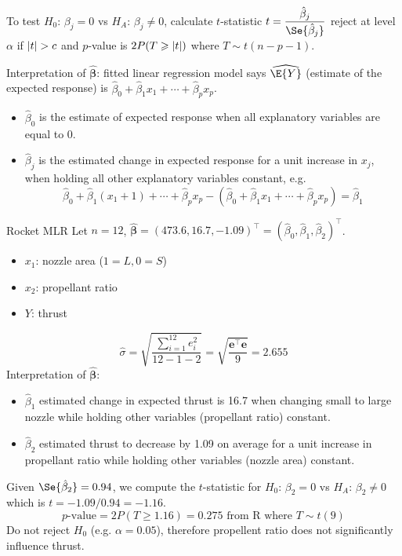 To test $ H_0 $: $ \beta_j=0 $ vs $ H_A $: $ \beta_j\neq 0 $,
calculate $ t $-statistic
$ t=\dfrac{\hat{\beta}_j}{\Se{\hat{\beta}_j}} $
reject at level $ \alpha $ if $ \lvert t\rvert>c $ and
$ p $-value is $ 2P(T\geqslant \lvert t\rvert) $ where $ T \sim t(n-p-1) $.

Interpretation of $ \hat{\symbf{\beta}} $: fitted linear
regression model says $ \widehat{\E{Y}} $
(estimate of the expected response) is
$ \hat{\beta}_0+\hat{\beta}_1x_1+\cdots+\hat{\beta}_p x_p $.
\begin{itemize}
    \item $ \hat{\beta}_0 $ is the estimate of expected response
          when all explanatory variables are equal to 0.
    \item $ \hat{\beta}_j $ is the estimated change
          in expected response for a unit increase in $ x_j $,
          when holding all other explanatory variables constant,
          e.g.\
          \[ \hat{\beta}_0+\hat{\beta}_1(x_1+1)+\cdots+\hat{\beta}_p x_p
              -(\hat{\beta}_0+\hat{\beta}_1 x_1+\cdots+\hat{\beta}_p x_p)=\hat{\beta}_1 \]
\end{itemize}

\begin{Example}{Rocket MLR}{}
    Let $ n=12 $, $ \hat{\symbf{\beta}}=(473.6, 16.7,-1.09)^\top
        =(\hat{\beta}_0,\hat{\beta}_1,\hat{\beta}_2)^\top $.
    \begin{itemize}
        \item $ x_1 $: nozzle area ($ 1 = L,0=S $)
        \item $ x_2 $: propellant ratio
        \item $ Y $: thrust
    \end{itemize}
    \[ \hat{\sigma}=\sqrt{\frac{\sum\limits_{i=1}^{12} e_i^2}{12-1-2}}=
        \sqrt{\frac{\symbf{e}^\top \symbf{e}}{9}}=
        2.655 \]
    Interpretation of $ \hat{\symbf{\beta}} $:
    \begin{itemize}
        \item $ \hat{\beta}_1 $ estimated change in expected thrust is 16.7
              when changing small to large nozzle while holding other variables
              (propellant ratio) constant.
        \item $ \hat{\beta}_2 $ estimated thrust to decrease by 1.09 on average
              for a unit increase in propellant ratio while holding other
              variables (nozzle area) constant.
    \end{itemize}
    Given $ \Se{\hat{\beta}_2}=0.94 $,
    we compute the $ t $-statistic for $ H_0 $: $ \beta_2=0 $ vs $ H_A $: $ \beta_2\neq 0 $
    which is $ t=-1.09/0.94=-1.16 $.
    \[ p\text{-value}=2P(T\geqslant 1.16)=0.275\text{ from R where } T \sim t(9)\]
    Do not reject $ H_0 $ (e.g. $ \alpha=0.05 $), therefore
    propellent ratio does not significantly influence thrust.
\end{Example}
